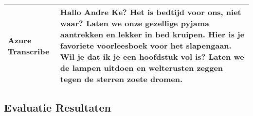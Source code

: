 \begin{table}[htbp]
\begin{tabularx}{\textwidth}{|l|X|}
        
        \\ \hline
        
        Azure Transcribe &          Hallo Andre Ke? Het is bedtijd voor ons, niet waar? Laten we onze gezellige pyjama aantrekken en lekker in bed kruipen. Hier is je favoriete voorleesboek voor het slapengaan. Wil je dat ik je een hoofdstuk vol is? Laten we de lampen uitdoen en welterusten zeggen tegen de sterren zoete dromen.
        
        \\ \hline  
    \end{tabularx}
\end{table}


\pagebreak

\subsection{Evaluatie Resultaten}

